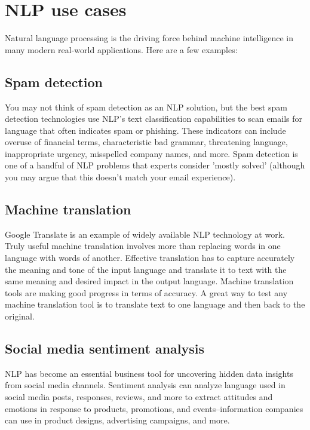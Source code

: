 \documentclass[11pt]{article}
\begin{document}
\clearpage

\section{NLP use cases}
\label{sec:org906b0bd}
Natural language processing is the driving force behind machine intelligence in
many modern real-world applications. Here are a few examples:
\subsection{Spam detection}
\label{sec:org88e1b15}
You may not think of spam detection as an NLP solution, but the best spam detection
technologies use NLP's text classification capabilities to scan emails for language
that often indicates spam or phishing. These indicators can include overuse of
financial terms, characteristic bad grammar, threatening language, inappropriate
urgency, misspelled company names, and more. Spam detection is one of a handful
of NLP problems that experts consider 'mostly solved' (although you may argue that
this doesn’t match your email experience).

\subsection{Machine translation}
\label{sec:org26ef1a8}
Google Translate is an example of widely available NLP technology at work.
Truly useful machine translation involves more than replacing words in one language
with words of another.  Effective translation has to capture accurately the meaning
and tone of the input language and translate it to text with the same meaning and
desired impact in the output language. Machine translation tools are making good
progress in terms of accuracy. A great way to test any machine translation tool is
to translate text to one language and then back to the original.

\subsection{Social media sentiment analysis}
\label{sec:orgde2e97c}
NLP has become an essential business tool for uncovering hidden data insights from
social media channels. Sentiment analysis can analyze language used in social media
posts, responses, reviews, and more to extract attitudes and emotions in response
to products, promotions, and events–information companies can use in product designs,
advertising campaigns, and more.
\end{document}
